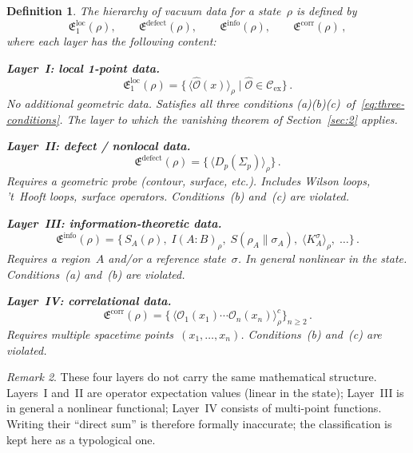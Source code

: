 \documentclass[
  aps,
  prd,
  preprint,
  groupedaddress,
  nofootinbib,
  longbibliography
]{revtex4-2}
\newtheorem{definition}{Definition}[section]
\theoremstyle{remark}
\newtheorem{remark}[definition]{Remark}
\newcommand{\Cex}{\mathcal{C}_{\mathrm{ex}}}
\begin{document}
\begin{definition}\label{def:four-layers}
The hierarchy of vacuum data for a state~$\rho$ is defined by
\begin{equation}\label{eq:four-layers}
  \mathfrak{E}_1^{\mathrm{loc}}(\rho),\qquad
  \mathfrak{E}^{\mathrm{defect}}(\rho),\qquad
  \mathfrak{E}^{\mathrm{info}}(\rho),\qquad
  \mathfrak{E}^{\mathrm{corr}}(\rho)\,,
\end{equation}
where each layer has the following content:

\textbf{Layer~I: local 1-point data.}
\begin{equation}\label{eq:layer-I}
  \mathfrak{E}_1^{\mathrm{loc}}(\rho)
  = \bigl\{\,
      \langle\hat{\mathcal{O}}(x)\rangle_\rho
      \;\big|\;
      \hat{\mathcal{O}}\in\Cex
    \bigr\}\,.
\end{equation}
No additional geometric data.
Satisfies all three conditions
(a)(b)(c)~of~\eqref{eq:three-conditions}.
The layer to which the vanishing theorem of Section~\ref{sec:2}
applies.

\textbf{Layer~II: defect / nonlocal data.}
\begin{equation}\label{eq:layer-II}
  \mathfrak{E}^{\mathrm{defect}}(\rho)
  = \bigl\{\,
      \langle D_p(\Sigma_p)\rangle_\rho
    \bigr\}\,.
\end{equation}
Requires a geometric probe (contour, surface, etc.).
Includes Wilson loops, 't~Hooft loops, surface operators.
Conditions~(b) and~(c) are violated.

\textbf{Layer~III: information-theoretic data.}
\begin{equation}\label{eq:layer-III}
  \mathfrak{E}^{\mathrm{info}}(\rho)
  = \bigl\{\,
      S_A(\rho),\;I(A:B)_\rho,\;
      S(\rho_A\|\sigma_A),\;
      \langle K_A^\sigma\rangle_\rho,\;\ldots
    \bigr\}\,.
\end{equation}
Requires a region~$A$ and/or a reference state~$\sigma$.
In general nonlinear in the state.
Conditions~(a) and~(b) are violated.

\textbf{Layer~IV: correlational data.}
\begin{equation}\label{eq:layer-IV}
  \mathfrak{E}^{\mathrm{corr}}(\rho)
  = \bigl\{\,
      \langle\mathcal{O}_1(x_1)\cdots
        \mathcal{O}_n(x_n)\rangle_\rho^c
    \bigr\}_{n\geq 2}\,.
\end{equation}
Requires multiple spacetime points~$(x_1,\ldots,x_n)$.
Conditions~(b) and~(c) are violated.
\end{definition}

\begin{remark}\label{rem:layers-not-sum}
These four layers do not carry the same mathematical structure.
Layers~I and~II are operator expectation values (linear in the
state); Layer~III is in general a nonlinear functional;
Layer~IV consists of multi-point functions.
Writing their ``direct sum'' is therefore formally inaccurate;
the classification is kept here as a typological one.
\end{remark}
\end{document}
